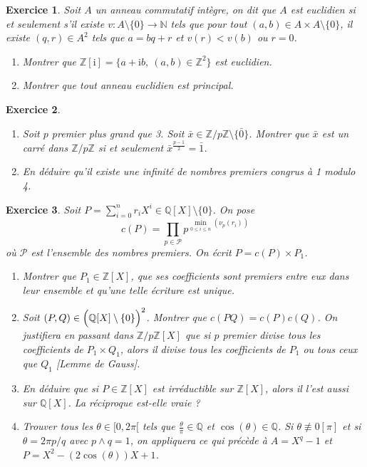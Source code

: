 \documentclass[12pt]{article}
\newtheorem{exercise}{Exercice}[section]
\theoremstyle{remark}
\theoremstyle{remark}
\newcommand{\Q}{\mathbb{Q}}
\newcommand{\N}{\mathbb{N}}
\newcommand{\Z}{\mathbb{Z}}
\begin{document}
\begin{exercise}
	Soit $A$ un anneau commutatif intègre, on dit que $A$ est euclidien si et
	seulement s'il existe $v:A\setminus\{0\}\to\N$ tels que pour tout $(a,b)\in
	A\times A\setminus\{0\}$, il existe $(q,r)\in A^{2}$ tels que $a=bq+r$ et
	$v(r)<v(b)$ ou $r=0$.
	\begin{enumerate}
		\item Montrer que $\Z[\mathrm{i}]=\{a+\mathrm{i}b,~(a,b)\in\Z^{2}\}$ est euclidien.
		\item Montrer que tout anneau euclidien est principal.
	\end{enumerate}
\end{exercise}

\begin{exercise}
	\phantom{}
	\begin{enumerate}
		\item Soit $p$ premier plus grand que 3. Soit
		$\bar{x}\in\Z/p\Z\setminus\{\bar{0}\}$. Montrer que $\bar{x}$ est un carré
		dans $\Z/p\Z$ si et seulement $\bar{x}^{\frac{p-1}{2}}=\bar{1}$.
		\item En déduire qu'il existe une infinité de nombres premiers congrus à
		1 modulo 4.
	\end{enumerate}
\end{exercise}

\begin{exercise}
	Soit $P=\sum_{i=0}^{n}r_{i}X^{i}\in\Q[X]\setminus\{0\}$. On pose
	$$c(P)=\prod_{p\in\mathcal{P}}p^{\min\limits_{0\leqslant i\leqslant
	n}(\nu_{p}(r_{i}))}$$
	où $\mathcal{P}$ est l'ensemble des nombres premiers. On écrit $P=c(P)\times
	P_{1}$.
	\begin{enumerate}
		\item Montrer que $P_{1}\in\Z[X]$, que ses coefficients sont premiers
		entre eux dans leur ensemble et qu'une telle écriture est unique.
		\item Soit $(P,Q)\in
		\Bigl(\Q[X]\setminus\{0\}\Bigr)^{2}$. Montrer que $c(PQ)=c(P)c(Q)$. On
		justifiera en passant dans $\Z/p\Z[X]$ que si $p$ premier divise tous
		les coefficients de $P_{1}\times Q_{1}$, alors il divise tous les
		coefficients de $P_{1}$ ou tous ceux que $Q_{1}$ [Lemme de Gauss].
		\item En déduire que si $P\in\Z[X]$ est irréductible sur $\Z[X]$, alors
		il l'est aussi sur $\Q[X]$. La réciproque est-elle vraie ?
		\item Trouver tous les $\theta\in[0,2\pi[$ tels que
		$\frac{\theta}{\pi}\in\Q$ et $\cos(\theta)\in\Q$. Si
		$\theta\not\equiv0[\pi]$ et si $\theta=2\pi p/q$ avec $p\wedge q=1$, on
		appliquera ce qui précède à $A=X^{q}-1$ et $P=X^{2}-(2\cos(\theta))X+1$.
	\end{enumerate}
\end{exercise}
\end{document}

